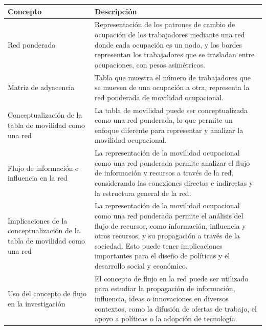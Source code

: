 \documentclass{article}
\begin{document}
\begin{table}[H]
\centering
\begin{tabularx}{\textwidth}{p{5cm}|p{9cm}}
\hline
\textbf{Concepto} & \textbf{Descripción} \\
\hline
Red ponderada & Representación de los patrones de cambio de ocupación de los trabajadores mediante una red donde cada ocupación es un nodo, y los bordes representan los trabajadores que se trasladan entre ocupaciones, con pesos asimétricos. \\
\hline
Matriz de adyacencia & Tabla que muestra el número de trabajadores que se mueven de una ocupación a otra, representa la red ponderada de movilidad ocupacional. \\
\hline
Conceptualización de la tabla de movilidad como una red & La tabla de movilidad puede ser conceptualizada como una red ponderada, lo que permite un enfoque diferente para representar y analizar la movilidad ocupacional. \\
\hline
Flujo de información e influencia en la red & La representación de la movilidad ocupacional como una red ponderada permite analizar el flujo de información y recursos a través de la red, considerando las conexiones directas e indirectas y la estructura general de la red. \\
\hline
Implicaciones de la conceptualización de la tabla de movilidad como una red & La representación de la movilidad ocupacional como una red ponderada permite el análisis del flujo de recursos, como información, influencia y otros recursos, y su propagación a través de la sociedad. Esto puede tener implicaciones importantes para el diseño de políticas y el desarrollo social y económico. \\
\hline
Uso del concepto de flujo en la investigación & El concepto de flujo en la red puede ser utilizado para estudiar la propagación de información, influencia, ideas o innovaciones en diversos contextos, como la difusión de ofertas de trabajo, el apoyo a políticas o la adopción de tecnología. \\
\hline
\end{tabularx}
\end{table}
\end{document}
